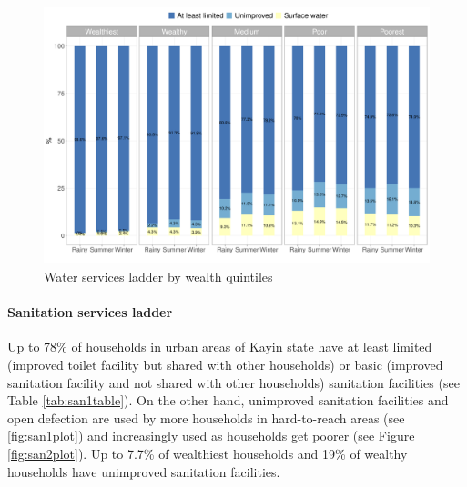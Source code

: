 \documentclass[12pt,a4paper]{article}
\let\oldparagraph\paragraph
\renewcommand{\paragraph}[1]{\oldparagraph{#1}\mbox{}}
\begin{document}
\begin{figure}[H]

{\centering \includegraphics{kayinReport_files/figure-latex/wash2plot-1} 

}

\caption{Water services ladder by wealth quintiles}\label{fig:wash2plot}
\end{figure}

\hypertarget{sanitation-services-ladder}{%
\paragraph{Sanitation services ladder}\label{sanitation-services-ladder}}

Up to 78\% of households in urban areas of Kayin state have at least limited (improved toilet facility but shared with other households) or basic (improved sanitation facility and not shared with other households) sanitation facilities (see Table \ref{tab:san1table}). On the other hand, unimproved sanitation facilities and open defection are used by more households in hard-to-reach areas (see \ref{fig:san1plot}) and increasingly used as households get poorer (see Figure \ref{fig:san2plot}). Up to 7.7\% of wealthiest households and 19\% of wealthy households have unimproved sanitation facilities.
\end{document}
